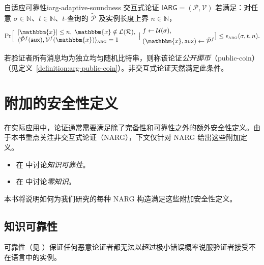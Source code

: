 \documentclass[american,singlepageview]{snargs-book-zh}
\newcommand{\Malicious}[1]{\tilde{#1}}
\newcommand{\Interact}[2]{\langle #1, #2 \rangle}
\newcommand{\AuxiliaryState}{\mathsf{aux}}
\newcommand{\SomeSize}[1]{|#1|}
\newcommand{\Naturals}{\mathbb{N}}
\newcommand{\Relation}{\mathcal{R}}
\newcommand{\Language}{\mathcal{L}}
\newcommand{\GetLanguage}[1]{\Language(#1)}
\newcommand{\Instance}{\mathbbm{x}}
\newcommand{\InstanceSize}{n}
\newcommand{\ProtoProver}{P}
\newcommand{\ProtoVerifier}{V}
\newcommand{\ProtoSoundnessError}{\epsilon}
\newcommand{\ARGSubscript}{\scriptscriptstyle\mathrm{ARG}}
\newcommand{\ARGFormat}[1]{\mathcal{#1}}
\newcommand{\ARGProver}{\ARGFormat{\ProtoProver}}
\newcommand{\ARGVerifier}{\ARGFormat{\ProtoVerifier}}
\newcommand{\ARGSystem}{(\ARGProver,\ARGVerifier)}
\newcommand{\ARGSoundnessError}{\ProtoSoundnessError_{\ARGSubscript}}
\newcommand{\ARGInteract}[2]{\Interact{#1}{#2}_{\scriptscriptstyle\mathrm{ARG}}}
\newcommand{\IARGSymbol}{\mathsf{IARG}}
\newcommand{\ROFunction}{f}
\newcommand{\ROQueryBound}{t}
\newcommand{\RODistribution}[1]{\mathcal{U}(#1)}
\newcommand{\ROAdvState}{\AuxiliaryState}
\newcommand{\ROOutputSize}{\sigma}
\begin{document}
\begin{ImportantDefinition}{自适应可靠性}{iarg-adaptive-soundness}
交互式论证 $\IARGSymbol=\ARGSystem$ 若满足：对任意 $\ROOutputSize\in\Naturals$、$\ROQueryBound\in\Naturals$、$\ROQueryBound$-查询的 $\Malicious{\ARGProver}$ 及实例长度上界 $\InstanceSize\in\Naturals$，
\[
\Pr\Bigl[
  \begin{array}{l}
    \SomeSize{\Instance}\le\InstanceSize,\;
    \Instance\notin\GetLanguage\Relation,\\
    \ARGInteract{\Malicious{\ARGProver}^{\ROFunction}(\ROAdvState)}{\ARGVerifier^{\ROFunction}(\Instance)}=1
  \end{array}
  \big|\;
  \begin{aligned}
    &\ROFunction\gets\RODistribution{\ROOutputSize},\\
    &(\Instance,\ROAdvState)\gets\Malicious{\ARGProver}^{\ROFunction}
  \end{aligned}
\bigr]
\le
\ARGSoundnessError(\ROOutputSize,\ROQueryBound,\InstanceSize).
\]
\end{ImportantDefinition}

若验证者所有消息均为独立均匀随机比特串，则称该论证\emph{公开掷币}（public-coin）（见定义~\ref{definition:arg-public-coin}）。非交互式论证天然满足此条件。

\chapter{附加的安全性定义}
\label{chapter:narg-advanced}

在实际应用中，论证通常需要满足除了完备性和可靠性之外的额外安全性定义。由于本书重点关注非交互式论证（NARG），下文仅针对 NARG 给出这些附加定义。
\begin{itemize}[noitemsep]
  \item 在  中讨论\emph{知识可靠性}。
  \item 在  中讨论\emph{零知识}。
\end{itemize}
本书将说明如何为我们研究的每种 NARG 构造满足这些附加安全性定义。

\section{知识可靠性}
\label{section:narg-knowledge-soundness}

可靠性（见 ）保证任何恶意论证者都无法以超过极小错误概率说服验证者接受不在语言中的实例。
\end{document}
